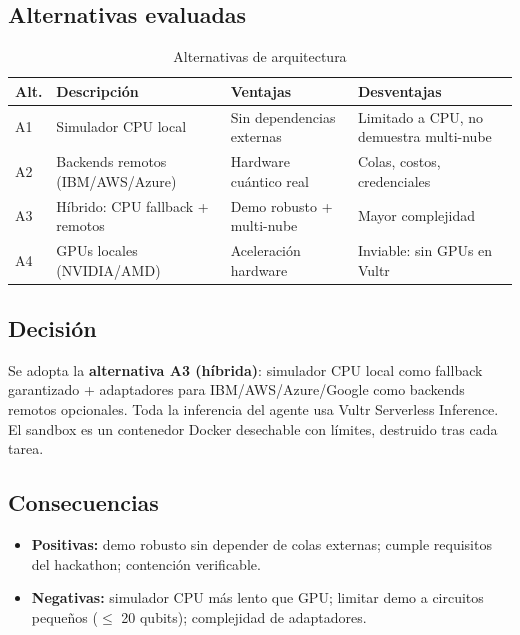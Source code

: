 \documentclass[11pt,a4paper]{article}
\begin{document}
\subsection{Alternativas evaluadas}

\begin{table}[h]
\centering
\begin{tabular}{lp{4cm}p{4cm}p{3cm}}
\toprule
\textbf{Alt.} & \textbf{Descripción} & \textbf{Ventajas} & \textbf{Desventajas} \\
\midrule
A1 & Simulador CPU local & Sin dependencias externas & Limitado a CPU, no demuestra multi-nube \\
A2 & Backends remotos (IBM/AWS/Azure) & Hardware cuántico real & Colas, costos, credenciales \\
A3 & Híbrido: CPU fallback + remotos & Demo robusto + multi-nube & Mayor complejidad \\
A4 & GPUs locales (NVIDIA/AMD) & Aceleración hardware & Inviable: sin GPUs en Vultr \\
\bottomrule
\end{tabular}
\caption{Alternativas de arquitectura}
\end{table}

\subsection{Decisión}

Se adopta la \textbf{alternativa A3 (híbrida)}: simulador CPU local como fallback
garantizado + adaptadores para IBM/AWS/Azure/Google como backends remotos
opcionales. Toda la inferencia del agente usa Vultr Serverless Inference. El
sandbox es un contenedor Docker desechable con límites, destruido tras cada tarea.

\subsection{Consecuencias}

\begin{itemize}
    \item \textbf{Positivas:} demo robusto sin depender de colas externas; cumple
    requisitos del hackathon; contención verificable.
    \item \textbf{Negativas:} simulador CPU más lento que GPU; limitar demo a
    circuitos pequeños ($\leq$ 20 qubits); complejidad de adaptadores.
\end{itemize}

\end{document}
